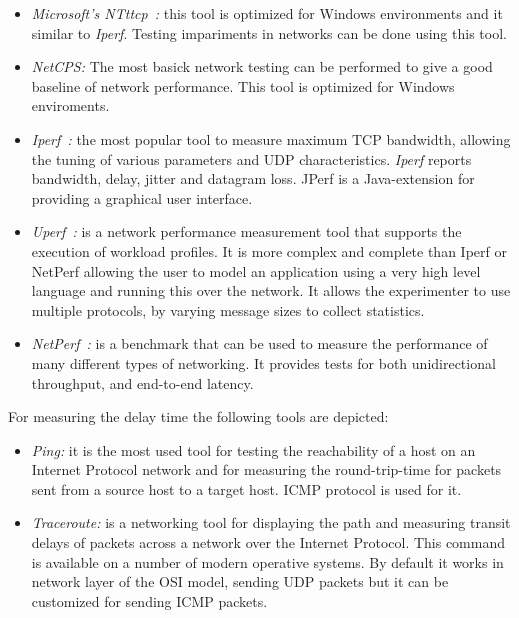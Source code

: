 \begin{itemize}
\item \emph{Microsoft's
    NTttcp~\cite{http://gallery.technet.microsoft.com/NTttcp-Version-528-Now-f8b12769}:}
  this tool is optimized for Windows environments and it similar to
  \emph{Iperf}. Testing impariments in networks can be done using this tool.
\item \emph{NetCPS:} The most basick network testing can be performed to give a
  good baseline of network performance. This tool is optimized for Windows
  enviroments.
\item \emph{Iperf~\cite{https://iperf.fr/}:} the most popular tool to measure maximum TCP bandwidth, allowing the
  tuning of various parameters and UDP characteristics. \emph{Iperf} reports
  bandwidth, delay, jitter and datagram loss. JPerf is a Java-extension for
  providing a graphical user interface.
\item \emph{Uperf~\cite{http://www.uperf.org/manual.html}:} is a network
  performance measurement tool that supports the execution of workload profiles. It
  is more complex and complete than Iperf or NetPerf allowing the user to model
  an application using a very high level language and running this over the
  network. It allows the experimenter to use multiple protocols, by varying message sizes to
  collect statistics.
\item \emph{NetPerf~\cite{http://www.netperf.org/netperf/}:} is a benchmark that can be used to measure the performance of many different types of networking. It provides tests for both unidirectional throughput, and end-to-end latency.
\end{itemize}

For measuring the delay time the following tools are depicted:
\begin{itemize}
\item \emph{Ping:} it is the most used tool for testing the reachability of a host on an
  Internet Protocol network and for measuring the round-trip-time for packets sent
  from a source host to a target host. \ac{ICMP} protocol is used for it.
\item \emph{Traceroute:} is a networking tool for displaying the path and
  measuring transit delays of packets across a network over the Internet
  Protocol. This command is available on a number of modern operative systems. By
  default it works in network layer of the \acs{OSI} model, sending \ac{UDP} packets but it can be customized
  for sending \ac{ICMP} packets.
\end{itemize}

